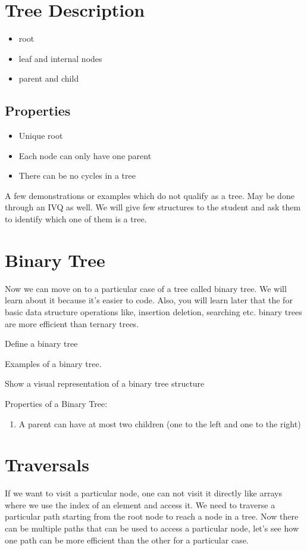 \documentclass[12pt,a4paper]{article}
\begin{document}
\section{Tree Description} 
\begin{itemize}
	\item root
	\item leaf and internal nodes
	\item parent and child
\end{itemize}

\subsection{Properties}
\begin{itemize}
	\item Unique root
	\item Each node can only have one parent
	\item There can be no cycles in a tree
\end{itemize}


A few demonstrations or examples which do not qualify as a tree.
May be done through an IVQ as well. We will give few structures to the student and ask them to identify which one of them is a tree. 

\section{Binary Tree}
Now we can move on to a particular case of a tree called binary tree. We will learn about it because it’s easier to code. Also, you will learn later that the for basic data structure operations like, insertion deletion, searching etc. binary trees are more efficient than ternary trees.

Define a binary tree

Examples of a binary tree.

Show a visual representation of a binary tree structure

Properties of a Binary Tree:
\begin{enumerate}
\item A parent can have at most two children (one to the left and one to the right)
\end{enumerate}

\section{Traversals}
If we want to visit a particular node, one can not visit it directly like arrays where we use the index of an element and access it. We need to traverse a particular path starting from the root node to reach a node in a tree. Now there can be multiple paths that can be used to access a particular node, let’s see how one path can be more efficient than the other for a particular case. 
\end{document}
